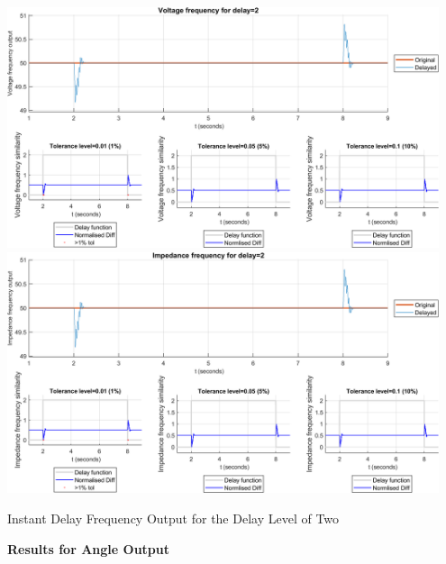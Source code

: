 \begin{floatingfigure}[p]{\textwidth}
    \includegraphics[width=0.95\textwidth]{PMUsim-figures/DelayOf_2/Instant_vFrequency.png}    
    \label{fig:PMUsim_Two_vFrequency}
    \includegraphics[width=0.95\textwidth]{PMUsim-figures/DelayOf_2/Instant_iFrequency.png}    
    \label{fig:PMUsim_Two_Frequency}
    \caption{Instant Delay Frequency Output for the Delay Level of Two}
\end{floatingfigure}


\newpage \textbf{Results for Angle Output}

